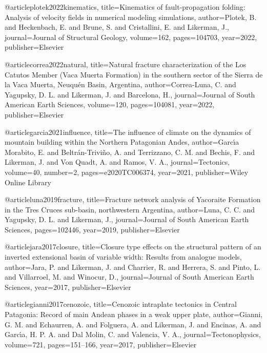 @article{plotek2022kinematics,
  title={Kinematics of fault-propagation folding: Analysis of velocity fields in numerical modeling simulations},
  author={Plotek, B. and Heckenbach, E. and Brune, S. and Cristallini, E. and Likerman, J.},
  journal={Journal of Structural Geology},
  volume={162},
  pages={104703},
  year={2022},
  publisher={Elsevier}
}

@article{correa2022natural,
  title={Natural fracture characterization of the Los Catutos Member (Vaca Muerta Formation) in the southern sector of the Sierra de la Vaca Muerta, Neuqu{\'e}n Basin, Argentina},
  author={Correa-Luna, C. and Yagupsky, D. L. and Likerman, J. and Barcelona, H.},
  journal={Journal of South American Earth Sciences},
  volume={120},
  pages={104081},
  year={2022},
  publisher={Elsevier}
}

@article{garcia2021influence,
  title={The influence of climate on the dynamics of mountain building within the Northern Patagonian Andes},
  author={Garc{\'\i}a Morabito, E. and Beltr{\'a}n-Trivi{\~n}o, A. and Terrizzano, C. M. and Bechis, F. and Likerman, J. and Von Quadt, A. and Ramos, V. A.},
  journal={Tectonics},
  volume={40},
  number={2},
  pages={e2020TC006374},
  year={2021},
  publisher={Wiley Online Library}
}

@article{luna2019fracture,
  title={Fracture network analysis of Yacoraite Formation in the Tres Cruces sub-basin, northwestern Argentina},
  author={Luna, C. C. and Yagupsky, D. L. and Likerman, J.},
  journal={Journal of South American Earth Sciences},
  pages={102446},
  year={2019},
  publisher={Elsevier}
}

@article{jara2017closure,
  title={Closure type effects on the structural pattern of an inverted extensional basin of variable width: Results from analogue models},
  author={Jara, P. and Likerman, J. and Charrier, R. and Herrera, S. and Pinto, L. and Villarroel, M. and Winocur, D.},
  journal={Journal of South American Earth Sciences},
  year={2017},
  publisher={Elsevier}
}

@article{gianni2017cenozoic,
  title={Cenozoic intraplate tectonics in Central Patagonia: Record of main Andean phases in a weak upper plate},
  author={Gianni, G. M. and Echaurren, A. and Folguera, A. and Likerman, J. and Encinas, A. and Garc{\'\i}a, H. P. A. and Dal Molin, C. and Valencia, V. A.},
  journal={Tectonophysics},
  volume={721},
  pages={151--166},
  year={2017},
  publisher={Elsevier}
}

